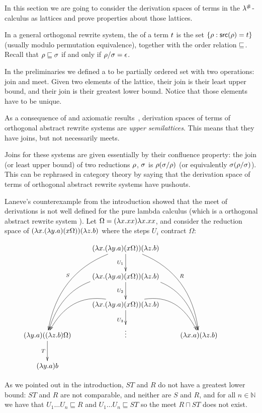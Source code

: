 In this section we are going to consider the derivation spaces of terms in
the $\lambda^{\mathtt{\#}}$-calculus as lattices and prove properties about those lattices.

In a general orthogonal rewrite system,
the  of a term $t$ is the set
$\{\rho : \mathsf{src}(\rho) = t\}$ (usually modulo permutation equivalence),
together with the order relation $\sqsubseteq$.
Recall that
$\rho \sqsubseteq \sigma$ if and only if $\rho / \sigma = \epsilon$.

In the preliminaries we defined a  to be partially ordered set with two operations:
join and meet. Given two elements of the lattice, their join is their least upper bound,
and their join is their greatest lower bound. Notice that those elements have to be unique.

As a consequence of
and axiomatic results~\cite{thesismellies},
derivation spaces of terms of orthogonal abstract rewrite systems are
\emph{upper semilattices}. This means that they have joins, but not necessarily meets.

Joins for these systems are given essentially by their confluence property:
the join (or least upper bound)
of two reductions $\rho$, $\sigma$ is $\rho (\sigma / \rho)$
(or equivalently $\sigma (\rho / \sigma)$).
This can be rephrased in category theory by saying that the derivation space of
terms of orthogonal abstract rewrite systems have pushouts.

\begin{example} Laneve's counterexample from the introduction
showed that the meet of derivations is not well defined for the pure lambda calculus
(which is a orthogonal abstract rewrite system \cite{thesismellies}).
Let $\Omega = (\lambda x. xx)\lambda x. xx$,
and consider the reduction space of
$(\lambda x. (\lambda y. a)(x \Omega)) (\lambda z. b)$
where the steps $U_i$ contract $\Omega$:

\[
  \xymatrix{
    &
    (\lam{\var}{(\lam{\vartwo}{a})(\var \Omega)}) (\lam{\varthree}{b})
    \ar_{U_1}[d]
    \ar@/_1cm/_{S}[dddl]
    \ar@/^1cm/^{R}[dddr]
    &
  \\
    &
    (\lam{\var}{(\lam{\vartwo}{a})(\var \Omega)}) (\lam{\varthree}{b})
    \ar@/_1cm/[ddl] \ar@/^1cm/[ddr]
    \ar_{U_2}[d]
    &
  \\
    &
    (\lam{\var}{(\lam{\vartwo}{a})(\var \Omega)}) (\lam{\varthree}{b})
    \ar@/_1cm/[dl] \ar@/^1cm/[dr]
    \ar_{U_3}[d]
    &
  \\
    (\lam{\vartwo}{a})((\lam{\varthree}{b}) \Omega)
    \ar_{T}[d]
    &
    \vdots
    &
    (\lam{\var}{a})(\lam{\varthree}{b})
  \\
    (\lam{\vartwo}{a}) b
    &
    &
    &
  }
\]

As we pointed out in the introduction,
$ST$ and $R$ do not have a greatest lower bound: $ST$ and $R$ are not
comparable, and neither are $S$ and $R$,
and for all $n \in \mathbb{N}$ we have that $U_1 \hdots U_n \sqsubseteq R$
and $U_1 \hdots U_n \sqsubseteq ST$ so the meet $R \sqcap ST$ does not exist.
\end{example}

